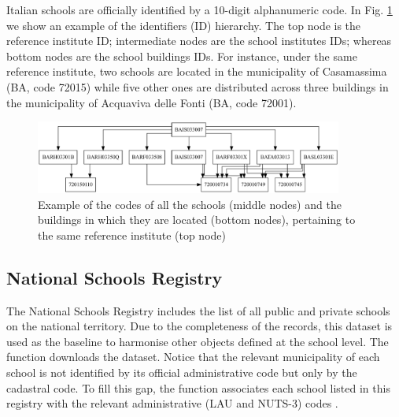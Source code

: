 \documentclass[openany]{book}
\begin{document}
Italian schools are officially identified by a 10-digit alphanumeric code. In Fig. \ref{fig:diagram} we show an example of the identifiers (ID) hierarchy. The top node is the reference institute ID; intermediate nodes are the school institutes IDs; whereas bottom nodes are the school buildings IDs. For instance, under the same reference institute, two schools are located in the municipality of Casamassima (BA, code 72015) while five other ones are distributed across three buildings in the municipality of Acquaviva delle Fonti (BA, code 72001).
\begin{figure}
  \centering
  \includegraphics[width = 0.9\textwidth]{SchoolDataIT/Fig2.pdf} 
  \caption{Example of the codes of all the schools (middle nodes) and the buildings in which they are located (bottom nodes), pertaining to the same reference institute (top node)}
  \label{fig:diagram}
\end{figure}

\subsection{National Schools Registry} \label{par:registry}
The National Schools Registry includes the list of all public and private schools on the national territory. Due to the completeness of the records, this dataset is used as the baseline to harmonise other objects defined at the school level. The function \texttt{} downloads the dataset. Notice that the relevant municipality of each school is not identified by its official administrative code but only by the cadastral code. To fill this gap, the function \texttt{} associates each school listed in this registry with the relevant administrative (LAU and NUTS-3) codes \citep{Situas}.
\end{document}
